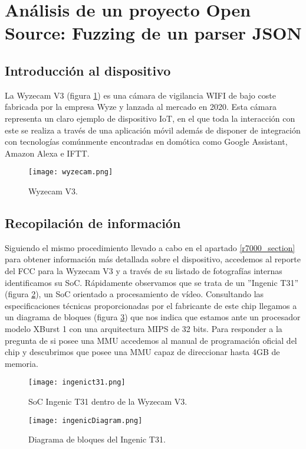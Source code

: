 \section{Análisis de un proyecto Open Source: Fuzzing de un parser JSON}
\subsection{Introducción al dispositivo}
La Wyzecam V3 (figura \ref{fig:wyzecam}) es una cámara de vigilancia WIFI de bajo coste fabricada por la empresa Wyze y lanzada al mercado
en 2020. Esta cámara representa
un claro ejemplo de dispositivo IoT, en el que toda la interacción con este se realiza a través de una aplicación móvil además de disponer de integración con 
tecnologías comúnmente encontradas en domótica como Google Assistant, Amazon Alexa e IFTT.

\begin{figure}[H]
    \centering
    \texttt{[image: wyzecam.png]}
    \caption{Wyzecam V3.}
    \label{fig:wyzecam}
\end{figure}

\subsection{Recopilación de información}
Siguiendo el mismo procedimiento llevado a cabo en el apartado \ref{r7000_section} para obtener información más detallada sobre
el dispositivo, accedemos al reporte del FCC para la Wyzecam V3\cite{wyzecamFCCid} y a través de su listado de fotografías internas
identificamos su SoC. Rápidamente observamos que se trata de un ''Ingenic T31'' (figura \ref{fig:ingenict31}), un SoC orientado a procesamiento 
de vídeo. Consultando las especificaciones técnicas proporcionadas por el fabricante de este chip llegamos a un diagrama de bloques 
(figura \ref{fig:ingenicDiagram}) que nos indica que estamos ante un procesador modelo XBurst 1 con una arquitectura MIPS de 32 bits.
Para responder a la pregunta de si posee una MMU accedemos al manual de programación oficial del chip\cite{xburstmanual} y descubrimos 
que posee una MMU capaz de direccionar hasta 4GB de memoria.

\begin{figure}[H]
    \centering
    \texttt{[image: ingenict31.png]}
    \caption{SoC Ingenic T31 dentro de la Wyzecam V3\cite{wyzecamFCCid}.}
    \label{fig:ingenict31}
\end{figure}

\begin{figure}[H]
    \centering
    \texttt{[image: ingenicDiagram.png]}
    \caption{Diagrama de bloques del Ingenic T31\cite{ingenicproductpage}.}
    \label{fig:ingenicDiagram}
\end{figure}

